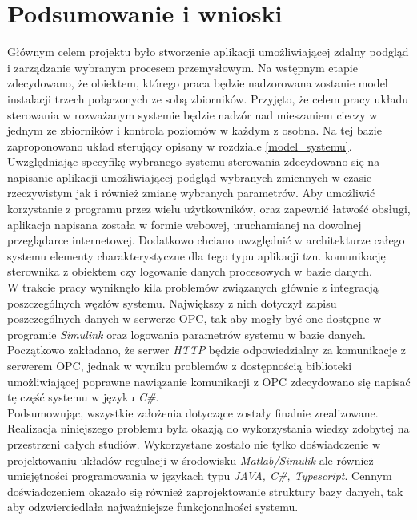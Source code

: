 \chapter{Podsumowanie i wnioski}

Głównym celem projektu było stworzenie aplikacji umożliwiającej zdalny podgląd i zarządzanie wybranym procesem przemysłowym. Na wstępnym etapie zdecydowano, że obiektem, którego praca będzie nadzorowana zostanie model instalacji trzech połączonych ze sobą zbiorników. Przyjęto, że celem pracy układu sterowania w rozważanym systemie będzie nadzór nad mieszaniem cieczy w jednym ze zbiorników i kontrola poziomów w każdym z osobna. Na tej bazie zaproponowano układ sterujący opisany w rozdziale \ref{model_systemu}.\\ 
%
Uwzględniając specyfikę wybranego systemu sterowania zdecydowano się na napisanie aplikacji umożliwiającej podgląd wybranych zmiennych w czasie rzeczywistym jak i również zmianę wybranych parametrów. Aby umożliwić korzystanie z programu przez wielu użytkowników, oraz zapewnić łatwość obsługi, aplikacja napisana została w formie webowej, uruchamianej na dowolnej  przeglądarce internetowej. Dodatkowo chciano uwzględnić w architekturze całego systemu elementy charakterystyczne dla tego typu aplikacji tzn. komunikację sterownika z obiektem czy logowanie danych procesowych w bazie danych. \\
% 
W trakcie pracy wyniknęło kila problemów związanych głównie z integracją poszczególnych węzłów systemu. Największy z nich dotyczył zapisu poszczególnych danych w serwerze OPC, tak aby mogły być one dostępne w programie \textit{Simulink} oraz logowania parametrów systemu w bazie danych. Początkowo zakładano, że serwer \textit{HTTP} będzie odpowiedzialny za komunikacje z serwerem OPC, jednak w wyniku problemów z dostępnością biblioteki umożliwiającej poprawne nawiązanie komunikacji z OPC zdecydowano się napisać tę część systemu w języku \textit{C\#}. \\ 
Podsumowując, wszystkie założenia dotyczące zostały finalnie zrealizowane. Realizacja niniejszego problemu  była okazją do wykorzystania wiedzy zdobytej na przestrzeni całych studiów. Wykorzystane zostało nie tylko doświadczenie w projektowaniu układów regulacji w środowisku \textit{Matlab/Simulik} ale również umiejętności programowania w językach typu \textit{JAVA, C\#, Typescript}. Cennym doświadczeniem okazało się również zaprojektowanie struktury bazy danych, tak aby odzwierciedlała najważniejsze funkcjonalności systemu.
